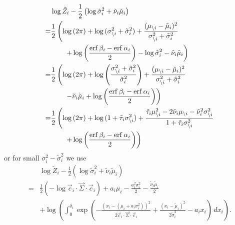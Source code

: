 \documentclass[11pt,twoside]{report}
\begin{document}
\begin{align}
  & \log{\tilde{Z}_i}
  - \frac{1}{2}
  \left(
  \log{\tilde{\sigma}_i^2}
  + \tilde{\nu}_i \tilde{\mu}_i
  \right)
  \nonumber \\ =&
  \frac{1}{2} \left(
  \log{(2\pi)} +
  \log{(\sigma_{\setminus i}^2 + \tilde{\sigma}_i^2)} +
  \frac{(\mu_{\setminus i} - \tilde{\mu}_i)^2}{\sigma_{\setminus i}^2 + \tilde{\sigma}_i^2}
  \right.
  \nonumber \\ & \qquad
  \left.
  + \log{\left(\frac{\operatorname{erf}{\beta_i} - \operatorname{erf}{\alpha_i}}{2}\right)}
  - \log{\tilde{\sigma}_i^2}
  - \tilde{\nu}_i \tilde{\mu}_i
  \right)
  \nonumber \\ =&
  \frac{1}{2} \left(
  \log{(2\pi)} +
  \log{\left(\frac{\sigma_{\setminus i}^2 + \tilde{\sigma}_i^2}{\tilde{\sigma}_i^2}\right)}
  + \frac{(\mu_{\setminus i} - \tilde{\mu}_i)^2}{\sigma_{\setminus i}^2 + \tilde{\sigma}_i^2}
  \right.
  \nonumber \\ & \qquad
  \left.
  - \tilde{\nu}_i \tilde{\mu}_i
  + \log{\left(\frac{\operatorname{erf}{\beta_i} - \operatorname{erf}{\alpha_i}}{2}\right)}
  \right)
  \nonumber \\ =&
  \frac{1}{2} \left(
  \log{(2\pi)} +
  \log{(1 + \tilde{\tau}_i \sigma_{\setminus i}^2)}
  + \frac{\tilde{\tau}_i \mu_{\setminus i}^2 - 2\tilde{\nu}_i \mu_{\setminus i} - \tilde{\nu}_i^2 \sigma_{\setminus i}^2}
  {1 + \tilde{\tau}_i \sigma_{\setminus i}^2}
  \right.
  \nonumber \\ & \qquad
  \left.
  + \log{\left(\frac{\operatorname{erf}{\beta_i} - \operatorname{erf}{\alpha_i}}{2}\right)}
  \right)
\end{align}
or for small $\sigma_i^2 - \tilde{\sigma}_i^2$ we use
\begin{equation}
  \begin{split}
    &
    \log{\tilde{Z}_i}
    - \frac{1}{2}
    \left(
    \log{\tilde{\sigma}_i^2}
    + \tilde{\nu}_i \tilde{\mu}_i
    \right)
    \\ =&
    \frac{1}{2} \left( -\log{\vec{c}_i \cdot \vec{\Sigma} \cdot \vec{c}_i} \right)
    + a_i \mu_i
    - \frac{a_i^2 \sigma_i^2}{2}
    - \frac{\tilde{\nu}_i \tilde{\mu}_i}{2}
    \\ & + 
    \log{\left(
      \int_0^{\delta_i}
      \exp{\left( -\frac{(x_i - (\mu_i + a_i \sigma_i^2))^2}{2 \vec{c}_i \cdot \vec{\Sigma} \cdot \vec{c}_i} +
        \frac{(x_i - \tilde{\mu}_i)^2}{2 \tilde{\sigma}_i^2} -a_i x_i \right)} \, dx_i
      \right)}.
  \end{split}
\end{equation}
\end{document}
